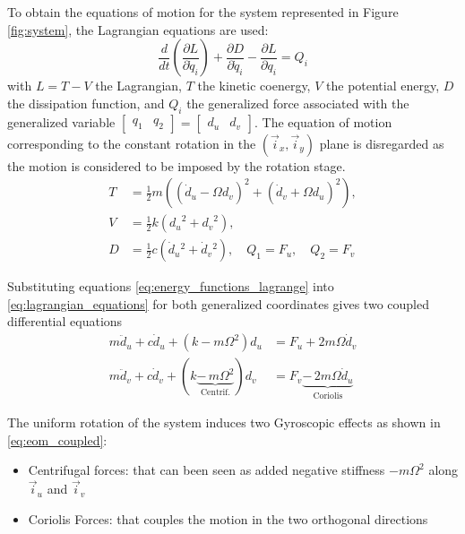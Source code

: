 \documentclass[Afour,sagev,times]{sagej}
\begin{document}
\par
To obtain the equations of motion for the system represented in Figure \ref{fig:system}, the Lagrangian equations are used:
\begin{equation}
\label{eq:lagrangian_equations}
  \frac{d}{dt} \left( \frac{\partial L}{\partial \dot{q}_i} \right) + \frac{\partial D}{\partial \dot{q}_i} - \frac{\partial L}{\partial q_i} = Q_i
\end{equation}
with \(L = T - V\) the Lagrangian, \(T\) the kinetic coenergy, \(V\) the potential energy, \(D\) the dissipation function, and \(Q_i\) the generalized force associated with the generalized variable \(\begin{bmatrix}q_1 & q_2\end{bmatrix} = \begin{bmatrix}d_u & d_v\end{bmatrix}\).
The equation of motion corresponding to the constant rotation in the \((\vec{i}_x, \vec{i}_y)\) plane is disregarded as the motion is considered to be imposed by the rotation stage.
\begin{equation}
\label{eq:energy_functions_lagrange}
  \begin{aligned}
    T &= \frac{1}{2} m \left( \left( \dot{d}_u - \Omega d_v \right)^2 + \left( \dot{d}_v + \Omega d_u \right)^2 \right), \\
    V &= \frac{1}{2} k \left( {d_u}^2 + {d_v}^2 \right), \\
    D &= \frac{1}{2} c \left( \dot{d}_u{}^2 + \dot{d}_v{}^2 \right), \quad Q_1 = F_u, \quad Q_2 = F_v
  \end{aligned}
\end{equation}

Substituting equations \eqref{eq:energy_functions_lagrange} into \eqref{eq:lagrangian_equations} for both generalized coordinates gives two coupled differential equations
\begin{subequations}
\label{eq:eom_coupled}
  \begin{align}
    m \ddot{d}_u + c \dot{d}_u + ( k - m \Omega^2 ) d_u &= F_u + 2 m \Omega \dot{d}_v \\
    m \ddot{d}_v + c \dot{d}_v + ( k \underbrace{-\,m \Omega^2}_{\text{Centrif.}} ) d_v &= F_v \underbrace{-\,2 m \Omega \dot{d}_u}_{\text{Coriolis}}
  \end{align}
\end{subequations}

The uniform rotation of the system induces two Gyroscopic effects as shown in \eqref{eq:eom_coupled}:
\begin{itemize}
\item Centrifugal forces: that can been seen as added negative stiffness \(- m \Omega^2\) along \(\vec{i}_u\) and \(\vec{i}_v\)
\item Coriolis Forces: that couples the motion in the two orthogonal directions
\end{itemize}
\end{document}

